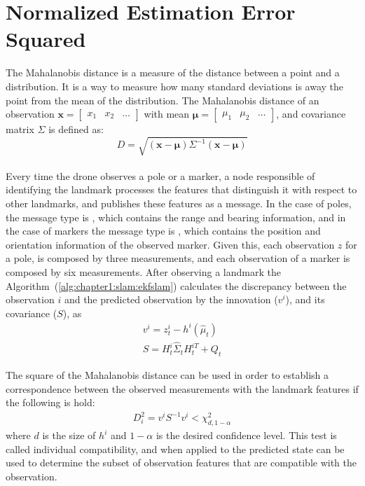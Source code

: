 \section{Normalized Estimation Error Squared}
\label{sec:chapter2:nees}
The Mahalanobis distance is a measure of the distance between a point and a distribution. It is a way to measure how many standard deviations is away the point from the mean of the distribution. The Mahalanobis distance of an observation $\bm{x} = \begin{bmatrix}x_1 & x_2 & \dots \end{bmatrix}$ with mean $\bm{\mu} = \begin{bmatrix}\mu_1 & \mu_2 & \dots \end{bmatrix}$, and covariance matrix $\Sigma$ is defined as:
\begin{equation}
    D = \sqrt{\left(\bm{x} - \bm{\mu}\right) \Sigma^{-1} \left(\bm{x} - \bm{\mu}\right)}
\end{equation}\\
Every time the drone observes a pole or a marker, a node responsible of identifying the landmark processes the features that distinguish it with respect to other landmarks, and publishes these features as a message. In the case of poles, the message type is , which contains the range and bearing information, and in the case of markers the message type is , which contains the position and orientation information of the observed marker. Given this, each observation $z$ for a pole, is composed by three measurements, and each observation of a marker is composed by six measurements. After observing a landmark the Algorithm~(\ref{alg:chapter1:slam:ekfslam}) calculates the discrepancy between the observation $i$ and the predicted observation by the innovation ($v^i$), and its covariance ($S$), as
\begin{align*}
    v^i =  z_t^i - h^i \left( \hat\mu_t \right)\\
    S = H_t^i \hat\Sigma_t H_t^{iT} + Q_t
\end{align*}

The square of the Mahalanobis distance can be used in order to establish a correspondence between the observed measurements with the landmark features if the following is hold:
\begin{align}
    D_i^2 = v^i S^{-1} v^i < \chi_{d, 1-\alpha}^2
    \label{eq:chapter2:nees:innov_test}
\end{align}
where $d$ is the size of $h^i$ and $1-\alpha$ is the desired confidence level. This test is called individual compatibility, and when applied to the predicted state can be used to determine the subset of observation features that are compatible with the observation.\\

